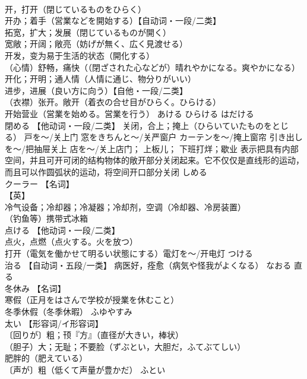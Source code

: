 \documentclass[8pt]{extreport}
\begin{document}
\begin{CJK}{UTF8}{min}
\\	开，打开（閉じているものをひらく） 
\\	开办；着手（営業などを開始する）【自动词・一段/二类】 
\\	拓宽，扩大；发展（閉じているものが開く） 
\\	宽敞；开阔；敞亮（妨げが無く、広く見渡せる） 
\\	开发，变为易于生活的状态（開化する） 
\\	（心情）舒畅，痛快（（閉ざされた心などが）晴れやかになる。爽やかになる） 
\\	开化；开明；通人情（人情に通じ、物分りがいい） 
\\	进步，进展（良い方に向う）【自他・一段/二类】 
\\	（衣襟）张开。敞开（着衣の合せ目がひらく。ひらける） 
\\	开始营业（営業を始める。営業を行う）	あける ひらける はだける	
\\	閉める	【他动词・一段/二类】 关闭，合上；掩上（ひらいていたものをとじる） 戸を〜/关上门 窓をきちんと〜/关严窗户 カーテンを〜/掩上窗帘 引き出しを〜/把抽屉关上 店を〜/关上店门； 上板儿； 下班打烊；歇业 表示把具有内部空间，并且可开可闭的结构物体的敞开部分关闭起来。它不仅仅是直线形的运动，而且可以作圆弧状的运动，将空间开口部分关闭	しめる	
\\	クーラー	【名词】 
\\	【英】
\\	冷气设备；冷却器；冷凝器；冷却剂，空调（冷却器、冷房装置） 
\\	（钓鱼等）携带式冰箱		
\\	点ける	【他动词・一段/二类】 
\\	点火，点燃（点火する。火を放つ） 
\\	打开（電気を働かせて明るい状態にする）電灯を〜/开电灯	つける	
\\	治る	【自动词・五段/一类】 病医好，痊愈（病気や怪我がよくなる）	なおる	直る
\\	冬休み	【名词】 
\\	寒假（正月をはさんで学校が授業を休むこと） 
\\	冬季休假（冬季休暇）	ふゆやすみ	
\\	太い	【形容词/イ形容词】 
\\	〔回りが〕粗；顸『方』（直径が大きい，棒状） 
\\	（胆子）大；无耻；不要脸（ずぶとい，大胆だ，ふてぶてしい） 
\\	肥胖的（肥えている） 
\\	〔声が〕粗（低くて声量が豊かだ）	ふとい	

\end{CJK}
\end{document}
